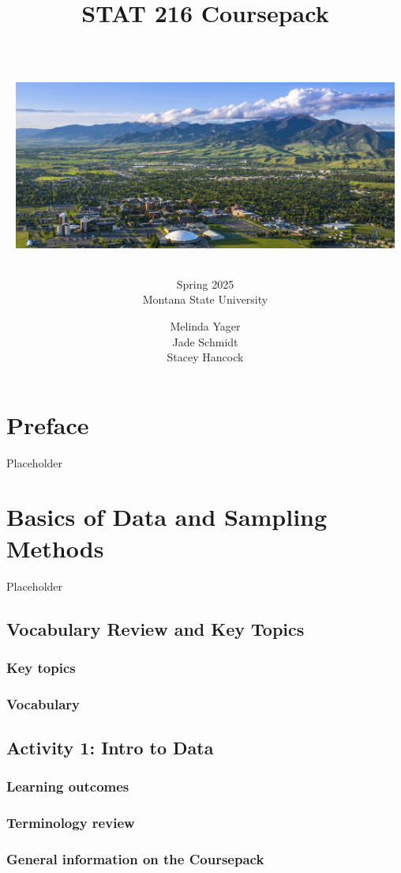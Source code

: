 \documentclass[
]{report}
\title{\textbf{STAT 216 Coursepack}\\
\strut \\
\includegraphics[width=5in,height=\textheight]{images/msu-campus.jpg}}
\subtitle{Spring 2025\\
Montana State University}
\author{Melinda Yager\\
Jade Schmidt\\
Stacey Hancock}
\date{}
\begin{document}
\maketitle

\chapter*{Preface}\label{preface}

Placeholder

\chapter{Basics of Data and Sampling Methods}\label{basics-of-data-and-sampling-methods}

Placeholder

\section{Vocabulary Review and Key Topics}\label{vocabulary-review-and-key-topics}

\subsection{Key topics}\label{key-topics}

\subsection{Vocabulary}\label{vocabulary}

\section{Activity 1: Intro to Data}\label{activity-1-intro-to-data}

\subsection{Learning outcomes}\label{learning-outcomes}

\subsection{Terminology review}\label{terminology-review}

\subsection{General information on the Coursepack}\label{general-information-on-the-coursepack}
\end{document}
